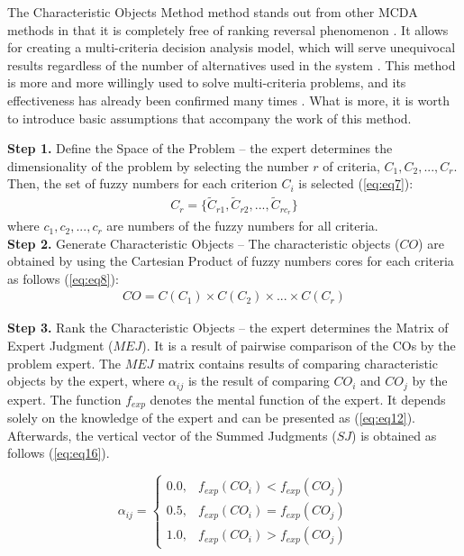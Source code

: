 The Characteristic Objects Method method stands out from other MCDA methods in that it is completely free of ranking reversal phenomenon \cite{salabun2019comet}. It allows for creating a multi-criteria decision analysis model, which will serve unequivocal results regardless of the number of alternatives used in the system \cite{kizielewicz2021new}. This method is more and more willingly used to solve multi-criteria problems, and its effectiveness has already been confirmed many times \cite{faizi2017group,salabun2018decision}. What is more, it is worth to introduce basic assumptions that accompany the work of this method.

\textbf{Step 1.} {Define the Space of the Problem} -- the expert determines the dimensionality of the problem by selecting the number $r$ of criteria, $C_1, C_2, ..., C_r$. Then, the set of fuzzy numbers for each criterion $C_i$ is selected (\ref{eq:eq7}):
\begin{equation}
\begin{array}{l}
C_r = \{\tilde{C}_{r1}, \tilde{C}_{r2}, ..., \tilde{C}_{rc_r}\}
\end{array}
\label{eq:eq7}
\end{equation}
where $c_1,c_2,...,c_r$ are numbers of the fuzzy numbers for all criteria. \\

\textbf{Step 2.} {Generate Characteristic Objects} --
The characteristic objects ($CO$) are obtained by using the Cartesian Product of fuzzy numbers cores for each criteria as follows (\ref{eq:eq8}):
\begin{equation}
\begin{array}{l}
CO = C(C_1) \times C(C_2) \times ... \times C(C_r)
\end{array}
\label{eq:eq8}
\end{equation}

\textbf{Step 3.} {Rank the Characteristic Objects} -- the expert determines the Matrix of Expert Judgment ($MEJ$). It is a result of pairwise comparison of the COs by the problem expert. The $MEJ$ matrix contains results of comparing characteristic objects by the expert, where $\alpha_{ij}$ is the result of comparing $CO_i$ and $CO_j$ by the expert. The function $f_{exp}$ denotes the mental function of the expert. It depends solely on the knowledge of the expert and can be presented as (\ref{eq:eq12}). Afterwards, the vertical vector of the Summed Judgments ($SJ$) is obtained as follows (\ref{eq:eq16}).

\begin{equation}
\alpha_{ij} = \left\{ \begin{array}{ll}
0.0 , & f_{exp}(CO_i)<f_{exp}(CO_j)\\
0.5 , & f_{exp}(CO_i)=f_{exp}(CO_j)\\
1.0 , & f_{exp}(CO_i)>f_{exp}(CO_j)
\end{array} \right.
\label{eq:eq12}
\end{equation}


